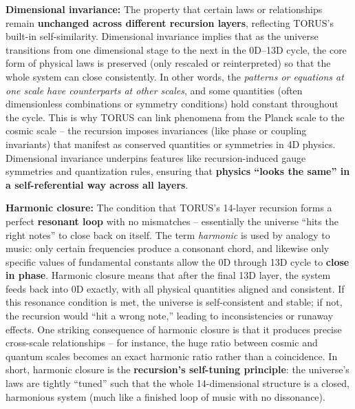 \documentclass[
]{article}
\begin{document}
\textbf{Dimensional invariance:} The property that certain laws or
relationships remain \textbf{unchanged across different recursion
layers}, reflecting TORUS's built-in self-similarity. Dimensional
invariance implies that as the universe transitions from one dimensional
stage to the next in the 0D--13D cycle, the core form of physical laws
is preserved (only rescaled or reinterpreted) so that the whole system
can close consistently. In other words, the \emph{patterns or equations
at one scale have counterparts at other scales}, and some quantities
(often dimensionless combinations or symmetry conditions) hold constant
throughout the cycle\hspace{0pt}. This is why TORUS can link phenomena
from the Planck scale to the cosmic scale -- the recursion imposes
invariances (like phase or coupling invariants) that manifest as
conserved quantities or symmetries in 4D physics\hspace{0pt}.
Dimensional invariance underpins features like recursion-induced gauge
symmetries and quantization rules, ensuring that \textbf{physics ``looks
the same'' in a self-referential way across all layers}.

\textbf{Harmonic closure:} The condition that TORUS's 14-layer recursion
forms a perfect \textbf{resonant loop} with no mismatches -- essentially
the universe ``hits the right notes'' to close back on itself. The term
\emph{harmonic} is used by analogy to music: only certain frequencies
produce a consonant chord, and likewise only specific values of
fundamental constants allow the 0D through 13D cycle to \textbf{close in
phase}\hspace{0pt}. Harmonic closure means that after the final 13D
layer, the system feeds back into 0D exactly, with all physical
quantities aligned and consistent\hspace{0pt}. If this resonance
condition is met, the universe is self-consistent and stable; if not,
the recursion would ``hit a wrong note,'' leading to inconsistencies or
runaway effects. One striking consequence of harmonic closure is that it
produces precise cross-scale relationships -- for instance, the huge
ratio between cosmic and quantum scales becomes an exact harmonic ratio
rather than a coincidence\hspace{0pt}. In short, harmonic closure is the
\textbf{recursion's self-tuning principle}: the universe's laws are
tightly ``tuned'' such that the whole 14-dimensional structure is a
closed, harmonious system (much like a finished loop of music with no
dissonance).
\end{document}
